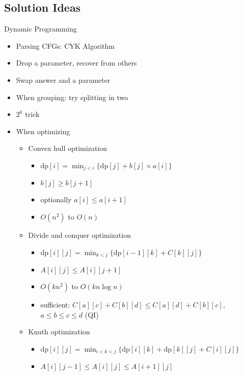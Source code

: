   \subsection{Solution Ideas}
    \begin{myitemize}
      \item Dynamic Programming
        \begin{itemize}
          \item Parsing CFGs: CYK Algorithm
          \item Drop a parameter, recover from others
          \item Swap answer and a parameter
          \item When grouping: try splitting in two
          \item $2^k$ trick
          \item When optimizing
              \begin{itemize}
                \item Convex hull optimization
                  \begin{itemize}
                    \item $\mathrm{dp}[i] = \min_{j<i}\{\mathrm{dp}[j] + b[j] \times a[i]\}$
                    \item $b[j] \geq b[j+1]$
                    \item optionally $a[i] \leq a[i+1]$
                    \item $O(n^2)$ to $O(n)$
                  \end{itemize}
                \item Divide and conquer optimization
                  \begin{itemize}
                    \item $\mathrm{dp}[i][j] = \min_{k<j}\{\mathrm{dp}[i-1][k] + C[k][j]\}$
                    \item $A[i][j] \leq A[i][j+1]$
                    \item $O(kn^2)$ to $O(kn\log{n})$
                    \item sufficient: $C[a][c] + C[b][d] \leq C[a][d] + C[b][c]$, $a\leq b\leq c\leq d$ (QI)
                  \end{itemize}
                \item Knuth optimization
                  \begin{itemize}
                    \item $\mathrm{dp}[i][j] = \min_{i<k<j}\{\mathrm{dp}[i][k] + \mathrm{dp}[k][j] + C[i][j]\}$
                    \item $A[i][j-1] \leq A[i][j] \leq A[i+1][j]$

\end{itemize}
\end{itemize}
\end{itemize}
\end{myitemize}
